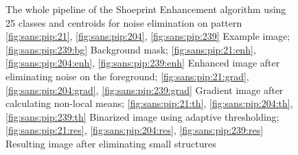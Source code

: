 \documentclass[draft,final]{vutinfth} %
\begin{document}
{\begin{figure}[H]

\caption{The whole pipeline of the Shoeprint Enhancement algorithm using 25 classes and centroids for noise elimination on pattern
				\ref{fig:sans:pip:21}, \ref{fig:sans:pip:204}, \ref{fig:sans:pip:239} Example image; \ref{fig:sans:pip:239:bg} Background mask; \ref{fig:sans:pip:21:enh}, \ref{fig:sans:pip:204:enh}, \ref{fig:sans:pip:239:enh} Enhanced image after eliminating noise on the foreground; \ref{fig:sans:pip:21:grad}, \ref{fig:sans:pip:204:grad}, \ref{fig:sans:pip:239:grad} Gradient image after calculating non-local means;  \ref{fig:sans:pip:21:th},  \ref{fig:sans:pip:204:th}, \ref{fig:sans:pip:239:th} Binarized image using adaptive thresholding; \ref{fig:sans:pip:21:res}, \ref{fig:sans:pip:204:res}, \ref{fig:sans:pip:239:res} Resulting image after eliminating small structures}
\label{fig:sans:pip}

\end{figure}
}
\end{document}
